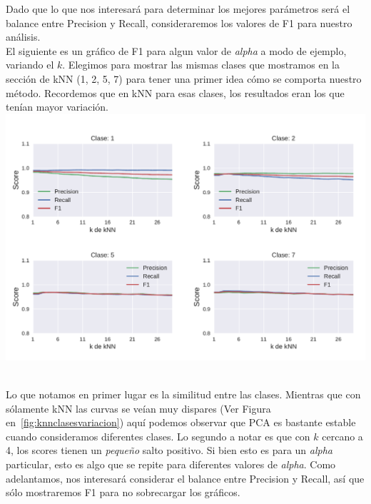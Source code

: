 Dado que lo que nos interesará para determinar los mejores parámetros será el balance entre Precision y Recall, consideraremos los valores de F1 para nuestro análisis.  \\

El siguiente es un gráfico de F1 para algun valor de \textit{alpha} a modo de ejemplo, variando el $k$. Elegimos para mostrar las mismas clases que mostramos en la sección de kNN (1, 2, 5, 7) para tener una primer idea cómo se comporta nuestro método. Recordemos que en kNN para esas clases, los resultados eran los que tenían mayor variación. \\

{\centering
    \includegraphics[scale=0.65]{informe/imagenes/pca/variacionKClases1257PresRecall.pdf} \\
}
$ $\newline

Lo que notamos en primer lugar es la similitud entre las clases. Mientras que con sólamente kNN las curvas se veían muy dispares (Ver Figura en~\ref{fig:knnclasesvariacion}) aquí podemos observar que PCA es bastante estable cuando consideramos diferentes clases. Lo segundo a notar es que con $k$ cercano a 4, los scores tienen un \textit{pequeño} salto positivo. Si bien esto es para un \textit{alpha} particular, esto es algo que se repite para diferentes valores de \textit{alpha}. Como adelantamos, nos interesará considerar el balance entre Precision y Recall, así que sólo mostraremos F1 para no sobrecargar los gráficos. \\


